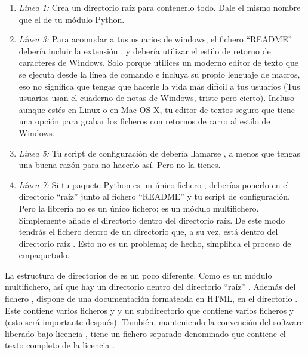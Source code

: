 \begin{enumerate}
  \item \emph{Línea 1:} Crea un directorio raíz para contenerlo todo. Dale el mismo nombre que el de tu módulo Python.
  \item \emph{Línea 3:} Para acomodar a tus usuarios de windows, el fichero ``README'' debería incluir la extensión , y debería utilizar el estilo de retorno de caracteres de Windows. Solo porque utilices un moderno editor de texto que se ejecuta desde la línea de comando e incluya su propio lenguaje de macros, eso no significa que tengas que hacerle la vida más difícil a tus usuarios (Tus usuarios usan el cuaderno de notas de Windows, triste pero cierto). Incluso aunque estés en Linux o en Mac OS X, tu editor de textos seguro que tiene una opción para grabar los ficheros con retornos de carro al estilo de Windows.

  \item \emph{Línea 5:} Tu script de configuración de  debería llamarse , a menos que tengas una buena razón para no hacerlo así. Pero no la tienes.
  \item \emph{Línea 7:} Si tu paquete Python es un único fichero , deberías ponerlo en el directorio ``raíz'' junto al fichero ``README'' y tu script de configuración. Pero la librería  no es un único fichero; es un módulo multifichero. Simplemente añade el directorio  dentro del directorio raíz. De este modo tendrás el fichero  dentro de un directorio  que, a su vez, está dentro del directorio raíz . Esto no es un problema; de hecho, simplifica el proceso de empaquetado.
\end{enumerate}

La estructura de directorios de  es un poco diferente. Como  es un módulo multifichero, así que hay un directorio  dentro del directorio ``raíz'' . Además del fichero ,  dispone de una documentación formateada en HTML, en el directorio . Este contiene varios ficheros  y  y un subdirectorio  que contiene varios ficheros  y  (esto será importante después). También, manteniendo la convención del software liberado bajo licencia , tiene un fichero separado denominado  que contiene el texto completo de la licencia .



